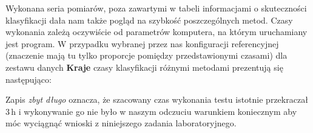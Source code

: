 \documentclass[a4paper]{classrep}
\begin{document}
Wykonana seria pomiarów, poza zawartymi w tabeli informacjami o skuteczności klasyfikacji
dała nam także pogląd na szybkość poszczególnych metod. Czasy wykonania zależą oczywiście
od parametrów komputera, na którym uruchamiany jest program. W przypadku wybranej przez
nas konfiguracji referencyjnej (znaczenie mają tu tylko proporcje pomiędzy przedstawionymi
czasami) dla zestawu danych \textbf{Kraje} czasy klasyfikacji różnymi metodami prezentują
się następująco:

\begin{table}[H]
\caption{Przybliżone czasy dla wybranego zestawu}
\end{table}

Zapis \emph{zbyt długo} oznacza, że szacowany czas wykonania testu istotnie przekraczał $3\,\mbox{h}$ i wykonywanie
go nie było w naszym odczuciu warunkiem koniecznym aby móc wyciągnąć wnioski z niniejszego zadania laboratoryjnego.
\end{document}
